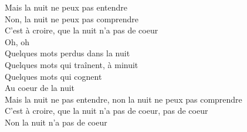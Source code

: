 Mais la nuit ne peux pas entendre \\
Non, la nuit ne peux pas comprendre \\
C'est à croire, que la nuit n'a pas de coeur \\
Oh, oh \\
Quelques mots perdus dans la nuit \\
Quelques mots qui traînent, à minuit \\
Quelques mots qui cognent \\
Au coeur de la nuit \\
Mais la nuit ne pas entendre, non la nuit ne peux pas comprendre \\
C'est à croire, que la nuit n'a pas de coeur, pas de coeur \\
Non la nuit n'a pas de coeur \\